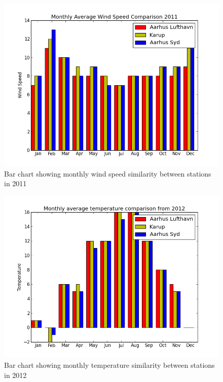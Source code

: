 \begin{figure}[H]
\centering
\includegraphics[width=0.85\linewidth,natwidth=898,natheight=587]{billeder/barChartMonthlyAverage2011.png}
\caption{Bar chart showing monthly wind speed similarity between stations in 2011}
\label{fig:barChartAverage2011}
\end{figure}

\begin{figure}[H]
\centering
\includegraphics[width=0.85\linewidth,natwidth=898,natheight=587]{billeder/barChartMonthlyTemperatureAverage.png}
\caption{Bar chart showing monthly temperature similarity between stations in 2012}
\label{fig:barChartTempAverage}
\end{figure}

